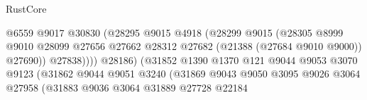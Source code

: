 \begin{lexlean}{RustCore}
\begin{coremodule}
                                                    @6559
                                                    @9017
                                                    @30830
                                                    (@28295
                                                      @9015
                                                      @4918
                                                      (@28299
                                                        @9015
                                                        (@28305
                                                          @8999
                                                          @9010
                                                          @28099
                                                          @27656
                                                          @27662
                                                          @28312
                                                          @27682
                                                          (@21388 (@27684 @9010 @9000))
                                                          @27690))
                                                      @27838))))
                                              @28186)
                                            (@31852
                                              @1390
                                              @1370
                                              @121
                                              @9044
                                              @9053
                                              @3070
                                              @9123
                                              (@31862
                                                @9044
                                                @9051
                                                @3240
                                                (@31869
                                                  @9043
                                                  @9050
                                                  @3095
                                                  @9026
                                                  @3064
                                                  @27958
                                                  (@31883
                                                    @9036
                                                    @3064
                                                    @31889
                                                    @27728
                                                    @22184

\end{coremodule}
\end{lexlean}
